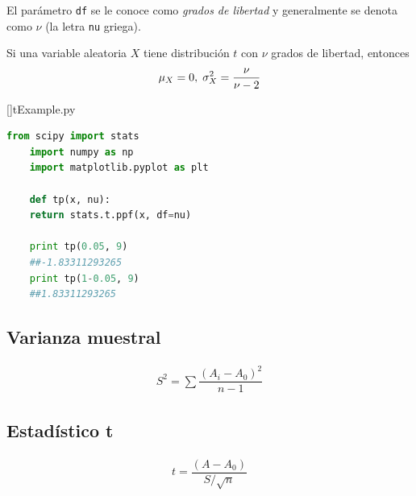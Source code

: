 El parámetro \texttt{df} se le conoce como \emph{grados de libertad} y generalmente se denota como $\nu$ (la letra \texttt{nu} griega).


Si una variable aleatoria $X$ tiene distribución $t$ con $\nu$ grados de libertad, entonces
\begin{align}
	\mu_{X}=0, \; \sigma^{2}_{X}=\dfrac{\nu}{\nu-2}
\end{align}





[]{tExample.py}
\begin{lstlisting}[language=Python]
	from scipy import stats
	import numpy as np
	import matplotlib.pyplot as plt
	
	def tp(x, nu):
	return stats.t.ppf(x, df=nu)
	
	print tp(0.05, 9)
	##-1.83311293265
	print tp(1-0.05, 9)
	##1.83311293265
\end{lstlisting}

\subsection{Varianza muestral}
\begin{align}
	S^{2}=\sum\dfrac{\left( A_{i}-A_{0} \right)^{2}}{n-1}
\end{align}


\subsection{Estadístico t}
\begin{align}
	t = \dfrac{\left( A-A_{0} \right)}{S/\sqrt{n}}
\end{align}


